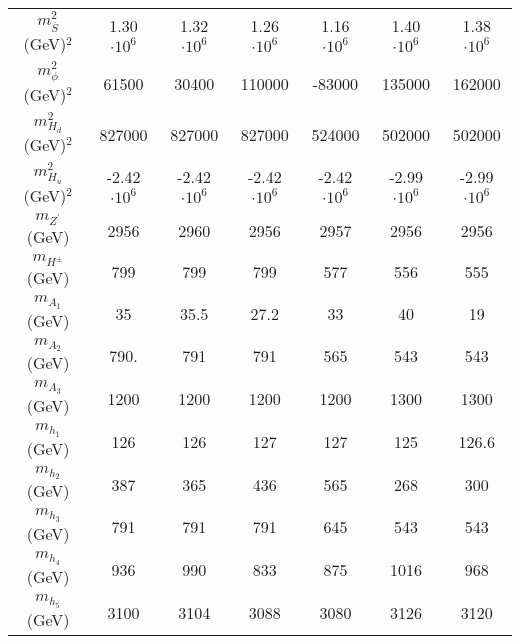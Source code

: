 \documentclass[12pt,a4paper]{article}
\begin{document}
\begin{table}
\begin{tabular}{| c || c | c |c| c| c| c |}
$m_{\overline{S}}^2$ (GeV)$^2$            &    1.30$\cdot 10^6$             &   1.32$\cdot 10^6$    & 	1.26 $\cdot 10^6$          &  1.16$\cdot 10^6$        &  1.40 $\cdot 10^6$    & 	1.38$\cdot 10^6$       \\
$m_\phi^2$ (GeV)$^2$                   &     61500                &  30400        & 	110000            & -83000           & 	135000    & 	162000         \\
$m_{H_d}^2$ (GeV)$^2$                  &   827000                 & 	827000       & 	827000             &  524000         & 	502000    & 	502000         \\
$m_{H_u}^2$ (GeV)$^2$                  &   -2.42$\cdot 10^6$            & 	-2.42$\cdot 10^6$    & 	-2.42$\cdot 10^6$          & -2.42$\cdot 10^6$       & 	-2.99$\cdot 10^6$         & 	-2.99$\cdot 10^6$ \\
\hline
$m_{Z^\prime}$ (GeV)                 &  	2956                & 	2960         & 	2956               & 2957            & 2956         & 	2956          \\
$m_{H^\pm}$ (GeV)                   &    	799                  & 	799          & 	799                & 577             & 556         & 	555           \\
$m_{A_1}$ (GeV)                    &	35                & 	35.5        & 	27.2               & 33              & 	40                & 	19    \\
$m_{A_2}$ (GeV)                    &	790.                 & 	791         & 	791                &  565            & 	543               & 	543   \\
$m_{A_3}$ (GeV)                    &     1200               & 	1200         & 	1200               & 1200             & 1300              & 	1300   \\
$m_{h_1}$ (GeV)                    &	126                & 	126         & 	127                & 127             & 	125               & 	126.6   \\
$m_{h_2}$ (GeV)                    &	387                 & 	365          & 	436                & 565             & 	268               & 	300    \\
$m_{h_3}$ (GeV)                    &	791               & 	791         & 	791                & 645             & 	543               & 	543    \\
$m_{h_4}$ (GeV)                    &	936                & 	990         & 	833                & 875             & 	1016              & 	968     \\
$m_{h_5}$ (GeV)                    &	3100                 & 	3104         & 	3088               & 3080         & 	3126              & 	3120   \\

\end{tabular}
\end{table}
\end{document}
